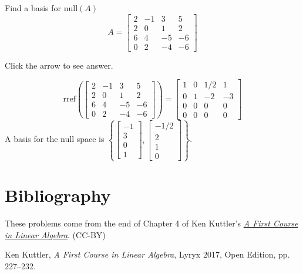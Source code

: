 \documentclass{ximera}
\begin{document}
\begin{problem}\label{prb:5.38} Find a basis for $\mbox{null} \left(A \right)$
$$ A = \left[ \begin{array}{rrrr}
2 & -1 & 3 & 5 \\
2 & 0 & 1 & 2 \\
6 & 4 & -5 & -6 \\
0 & 2 & -4 & -6
\end{array} \right]$$

Click the arrow to see answer.

\begin{expandable}
 $$\text{rref}\left(\left[ \begin{array}{rrrr}
2 & -1 & 3 & 5 \\
2 & 0 & 1 & 2 \\
6 & 4 & -5 & -6 \\
0 & 2 & -4 & -6
\end{array} \right]\right)=
 \begin{bmatrix} 1 &0 &1/2 &1\\
 0 &1 &-2 &-3\\
 0& 0& 0& 0\\
 0& 0& 0& 0\end{bmatrix}
 $$  A basis for the null space is $\left\{\begin{bmatrix}
     -1\\3\\0\\1
 \end{bmatrix}, \begin{bmatrix}
     -1/2\\2\\1\\0
 \end{bmatrix}\right\}$.
\end{expandable}
\end{problem}

\section*{Bibliography}
These problems come from the end of Chapter 4 of Ken Kuttler's \href{https://open.umn.edu/opentextbooks/textbooks/a-first-course-in-linear-algebra-2017}{\it A First Course in Linear Algebra}. (CC-BY)

Ken Kuttler, {\it  A First Course in Linear Algebra}, Lyryx 2017, Open Edition, pp. 227--232.
\end{document}
